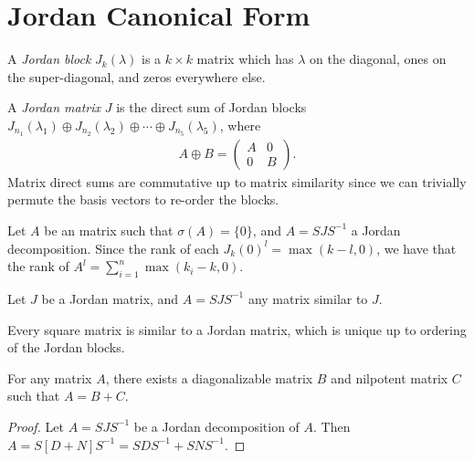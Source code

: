 \section{Jordan Canonical Form}

\begin{defn}
    A \emph{Jordan block} $J_k(\lambda)$ is a $k \times k$ matrix which has $\lambda$ on the diagonal, ones on the super-diagonal, and zeros everywhere else.
\end{defn}

\begin{defn}
    A \emph{Jordan matrix} $J$ is the direct sum of Jordan blocks $J_{n_1}(\lambda_1) \oplus J_{n_2}(\lambda_2) \oplus \cdots \oplus J_{n_5}(\lambda_5)$, where
    \begin{align*}
        A \oplus B = \begin{pmatrix}
            A & 0 \\ 0 & B
        \end{pmatrix}.
    \end{align*}
    Matrix direct sums are commutative up to matrix similarity since we can trivially permute the basis vectors to re-order the blocks.
\end{defn}

\begin{lemma}
    Let $A$ be an matrix such that $\sigma(A) = \{0\}$, and $A = SJS^{-1}$ a Jordan decomposition. Since the rank of each $J_k(0)^l = \max(k-l, 0)$, we have that the rank of $A^l = \sum_{i=1}^{n}\max(k_i-k, 0)$.
\end{lemma}

\begin{lemma}
    Let $J$ be a Jordan matrix, and $A = SJS^{-1}$ any matrix similar to $J$.
\end{lemma}

\begin{thm}
    Every square matrix is similar to a Jordan matrix, which is unique up to ordering of the Jordan blocks.
\end{thm}

\begin{thm}
    For any matrix $A$, there exists a diagonalizable matrix $B$ and nilpotent matrix $C$ such that $A = B + C$.
\end{thm}

\begin{proof}
    Let $A = SJS^{-1}$ be a Jordan decomposition of $A$. Then $A = S[D + N]S^{-1} = SDS^{-1} + SNS^{-1}$.
\end{proof}

